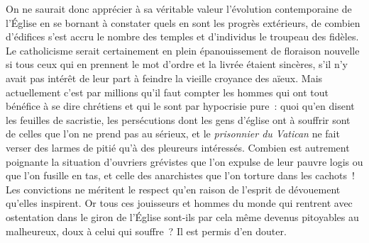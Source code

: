 \documentclass[french,twoside]{book} %
\begin{document}
On ne saurait donc apprécier à sa véritable valeur l’évolution contemporaine  de l’Église en se bornant à constater quels en sont les progrès extérieurs, de combien d’édifices s’est accru le nombre des temples et d’individus le troupeau des fidèles. Le catholicisme serait certainement en plein épanouissement de floraison nouvelle si tous ceux qui en prennent le mot d’ordre et la livrée étaient sincères, s’il n’y avait pas intérêt de leur part à feindre la vieille croyance des aïeux. Mais actuellement c’est par millions qu’il faut compter les hommes qui ont tout bénéfice à se dire chrétiens et qui le sont par hypocrisie pure : quoi qu’en disent les feuilles de sacristie, les persécutions dont les gens d’église ont à souffrir sont de celles que l’on ne prend pas au sérieux, et le \emph{prisonnier du Vatican} ne fait verser  des larmes de pitié qu’à des pleureurs intéressés. Combien est autrement poignante la situation d’ouvriers grévistes que l’on expulse de leur pauvre logis ou que l’on fusille en tas, et celle des anarchistes que l’on torture dans les cachots ! Les convictions ne méritent le respect qu’en raison de l’esprit de dévouement qu’elles inspirent. Or tous ces jouisseurs et hommes du monde qui rentrent avec ostentation dans le giron de l’Église sont-ils par cela même devenus pitoyables au malheureux, doux à celui qui souffre ? Il est permis d’en douter.\par
\end{document}
